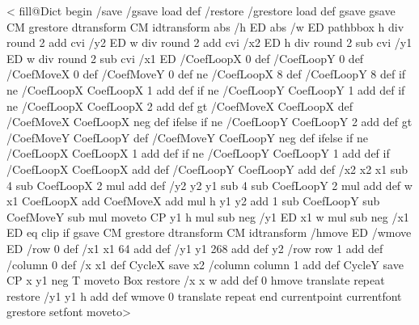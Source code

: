 <
  \ifPSTlualatex
    fill@Dict begin
    /save /gsave load def
    /restore /grestore load def
  \fi
  gsave
    gsave \tx@STV CM grestore dtransform CM idtransform
    abs /h ED abs /w ED
    pathbbox 
    h div round 2 add cvi /y2 ED
    w div round 2 add cvi /x2 ED
    h div round 2 sub cvi /y1 ED
    w div round 2 sub cvi /x1 ED
    /CoefLoopX 0 def
    /CoefLoopY 0 def
    /CoefMoveX 0 def
    /CoefMoveY 0 def
    \psk@boxfillangle{} ne {/CoefLoopX 8 def /CoefLoopY 8 def} if
    \psk@fillcyclex{} ne {/CoefLoopX CoefLoopX 1 add def} if
    \psk@fillcycley{} ne {/CoefLoopY CoefLoopY 1 add def} if
    \psk@fillmovex{} ne
      {/CoefLoopX CoefLoopX 2 add def
       \psk@fillmovex{} gt {/CoefMoveX CoefLoopX def}
                           {/CoefMoveX CoefLoopX neg def} ifelse} if
    \psk@fillmovey{} ne
      {/CoefLoopY CoefLoopY 2 add def
       \psk@fillmovey{} gt {/CoefMoveY CoefLoopY def}
                           {/CoefMoveY CoefLoopY neg def} ifelse} if
    \psk@fillsepx{} ne {/CoefLoopX CoefLoopX 1 add def} if
    \psk@fillsepy{} ne {/CoefLoopY CoefLoopY 1 add def} if
    /CoefLoopX CoefLoopX \psk@fillloopaddx\space add def
    /CoefLoopY CoefLoopY \psk@fillloopaddy\space add def
    /x2 x2 x1 sub 4 sub CoefLoopX 2 mul add def
    /y2 y2 y1 sub 4 sub CoefLoopY 2 mul add def
    w x1 CoefLoopX add CoefMoveX add mul
      h y1 y2 add 1 sub CoefLoopY sub CoefMoveY sub mul moveto
    CP 
    y1 h mul sub neg /y1 ED
    x1 w mul sub neg /x1 ED
     eq {clip} if
    \psk@fillmovex\space \psk@fillmovey
    gsave \tx@STV CM grestore dtransform CM idtransform
    /hmove ED /wmove ED
    /row 0 def
  \ifPSTlualatex
    /x1 x1 64 add  def
    /y1 y1 268 add  def
  \fi
   y2 {
       /row row 1 add def
       /column 0 def
       /x x1 def
       CycleX
       save
       x2 {
          /column column 1 add def
          CycleY
          save CP x y1 
          \ifPSTlualatex neg \fi
          T moveto Box restore
          /x x w add def
          0 hmove translate
          } repeat
       restore
       /y1 y1 h add def
       wmove 0 translate
       } repeat
  \ifPSTlualatex end \fi
  currentpoint currentfont grestore setfont moveto>
\fi

